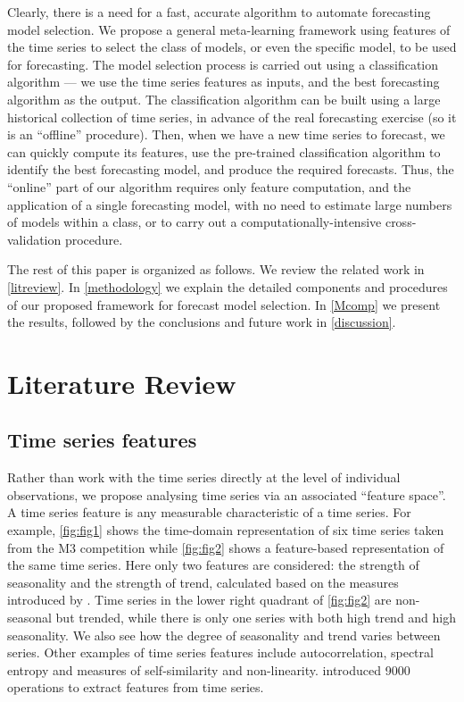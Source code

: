 \documentclass[11pt,a4paper,]{article}
\theoremstyle{definition}
\theoremstyle{definition}
\theoremstyle{definition}
\theoremstyle{remark}
\begin{document}
Clearly, there is a need for a fast, accurate algorithm to automate
forecasting model selection. We propose a general meta-learning
framework using features of the time series to select the class of
models, or even the specific model, to be used for forecasting. The
model selection process is carried out using a classification algorithm
--- we use the time series features as inputs, and the best forecasting
algorithm as the output. The classification algorithm can be built using
a large historical collection of time series, in advance of the real
forecasting exercise (so it is an ``offline'' procedure). Then, when we
have a new time series to forecast, we can quickly compute its features,
use the pre-trained classification algorithm to identify the best
forecasting model, and produce the required forecasts. Thus, the
``online'' part of our algorithm requires only feature computation, and
the application of a single forecasting model, with no need to estimate
large numbers of models within a class, or to carry out a
computationally-intensive cross-validation procedure.

The rest of this paper is organized as follows. We review the related
work in \autoref{litreview}. In \autoref{methodology} we explain the
detailed components and procedures of our proposed framework for
forecast model selection. In \autoref{Mcomp} we present the results,
followed by the conclusions and future work in \autoref{discussion}.

\section{Literature Review}\label{litreview}

\subsection{Time series features}\label{time-series-features}

Rather than work with the time series directly at the level of
individual observations, we propose analysing time series via an
associated ``feature space''. A time series feature is any measurable
characteristic of a time series. For example, \autoref{fig:fig1} shows
the time-domain representation of six time series taken from the M3
competition \autocite{makridakis2000m3} while \autoref{fig:fig2} shows a
feature-based representation of the same time series. Here only two
features are considered: the strength of seasonality and the strength of
trend, calculated based on the measures introduced by
\textcite{wang2009rule}. Time series in the lower right quadrant of
\autoref{fig:fig2} are non-seasonal but trended, while there is only one
series with both high trend and high seasonality. We also see how the
degree of seasonality and trend varies between series. Other examples of
time series features include autocorrelation, spectral entropy and
measures of self-similarity and non-linearity.
\textcite{fulcher2014highly} introduced 9000 operations to extract
features from time series.
\end{document}
